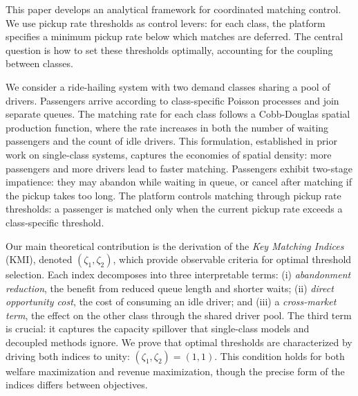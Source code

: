 This paper develops an analytical framework for coordinated matching control.
We use pickup rate thresholds as control levers: for each class, the platform specifies a minimum pickup rate below which matches are deferred.
The central question is how to set these thresholds optimally, accounting for the coupling between classes.


We consider a ride-hailing system with two demand classes sharing a pool of drivers.
Passengers arrive according to class-specific Poisson processes and join separate queues.
The matching rate for each class follows a Cobb-Douglas spatial production function, where the rate increases in both the number of waiting passengers and the count of idle drivers.
This formulation, established in prior work on single-class systems, captures the economies of spatial density: more passengers and more drivers lead to faster matching.
Passengers exhibit two-stage impatience: they may abandon while waiting in queue, or cancel after matching if the pickup takes too long.
The platform controls matching through pickup rate thresholds: a passenger is matched only when the current pickup rate exceeds a class-specific threshold.

Our main theoretical contribution is the derivation of the \emph{Key Matching Indices} (KMI), denoted $(\zeta_1, \zeta_2)$, which provide observable criteria for optimal threshold selection.
Each index decomposes into three interpretable terms:
(i) \emph{abandonment reduction}, the benefit from reduced queue length and shorter waits;
(ii) \emph{direct opportunity cost}, the cost of consuming an idle driver; and
(iii) a \emph{cross-market term}, the effect on the other class through the shared driver pool.
The third term is crucial: it captures the capacity spillover that single-class models and decoupled methods ignore.
We prove that optimal thresholds are characterized by driving both indices to unity: $(\zeta_1, \zeta_2) = (1,1)$.
This condition holds for both welfare maximization and revenue maximization, though the precise form of the indices differs between objectives.


